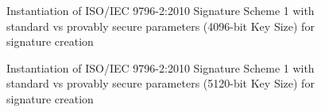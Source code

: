 \documentclass[]{final_report}
\theoremstyle{definition}
\begin{document}
\begin{figure}[H]
    \centering %
     \caption{Instantiation of ISO/IEC 9796-2:2010 Signature Scheme 1 with standard vs provably secure parameters (4096-bit Key Size) for signature creation}
    \begin{minipage}{\textwidth}
        \centering
    \end{minipage}
             \label{iso_sign_4096bit_table}
\end{figure}

\begin{figure}[H]
    \centering %
     \caption{Instantiation of ISO/IEC 9796-2:2010 Signature Scheme 1 with standard vs provably secure parameters (5120-bit Key Size) for signature creation}
    \begin{minipage}{\textwidth}
        \centering
    \end{minipage}
     \label{iso_sign_5120bit_table}
\end{figure}
\end{document}
